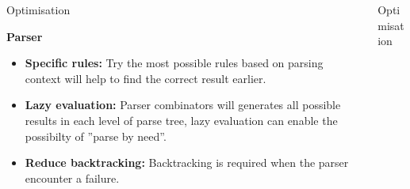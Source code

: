 \documentclass[final]{beamer}
\newlength{\onecolwid}
\newlength{\twocolwid}
\begin{document}
\begin{frame}[t]
\begin{columns}[t]
\begin{column}{\twocolwid}

\begin{columns}[t,totalwidth=\twocolwid] %

\begin{column}{\onecolwid} %


\begin{block}{Optimisation}

\textbf{Parser}
\begin{itemize}
\item \textbf{Specific rules:} Try the most possible rules based on parsing context will help to find the correct result earlier.
\item \textbf{Lazy evaluation:} Parser combinators will generates all possible results in each level
of parse tree, lazy evaluation can enable the possibilty of ''parse by need''.
\item \textbf{Reduce backtracking:} Backtracking is required when the parser encounter a failure.

\end{itemize}

\end{block}


\end{column} %

\begin{column}{\onecolwid} %


\begin{block}{Optimisation}




\end{block}
\end{column}
\end{columns}
\end{column}
\end{columns}
\end{frame}
\end{document}
